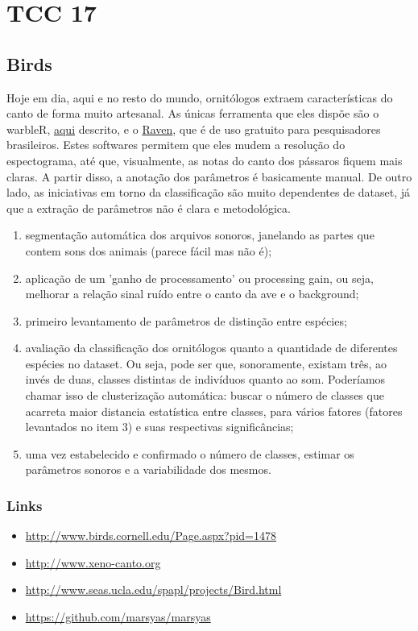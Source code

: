 \documentclass[11pt]{article}
\author{Felipe Felix}
\date{\today}
\title{}
\begin{document}
\tableofcontents


\section{TCC 17}
\label{sec:org5c751d4}
\subsection{Birds}
\label{sec:org2c85691}
Hoje em dia, aqui e no resto do mundo, ornitólogos extraem características do
canto de forma muito artesanal. As únicas ferramenta que eles dispõe são o
warbleR, \href{http://onlinelibrary.wiley.com/doi/10.1111/2041-210X.12624/full}{aqui} descrito, e o \href{http://www.birds.cornell.edu/brp/raven/RavenOverview.html}{Raven}, que é de uso gratuito para pesquisadores
brasileiros. Estes softwares permitem que eles mudem a resolução do
espectograma, até que, visualmente, as notas do canto dos pássaros fiquem
mais claras. A partir disso, a anotação dos parâmetros é basicamente manual.
De outro lado, as iniciativas em torno da classificação são muito dependentes
de dataset, já que a extração de parâmetros não é clara e metodológica.

\begin{enumerate}
\item segmentação automática dos arquivos sonoros, janelando as partes que contem sons dos animais (parece fácil mas não é);
\item aplicação de um 'ganho de processamento' ou processing gain, ou seja, melhorar a relação sinal ruído entre o canto da ave e o background;
\item primeiro levantamento de parâmetros de distinção entre espécies;
\item avaliação da classificação dos ornitólogos quanto a quantidade de diferentes espécies no dataset. Ou seja, pode ser que, sonoramente, existam três, ao invés de duas, classes distintas de indivíduos quanto ao som. Poderíamos chamar isso de clusterização automática: buscar o número de classes que acarreta maior distancia estatística entre classes, para vários fatores (fatores levantados no item 3) e suas respectivas significâncias;
\item uma vez estabelecido e confirmado o número de classes, estimar os parâmetros sonoros e a variabilidade dos mesmos.
\end{enumerate}

\subsubsection{Links}
\label{sec:org14b0b65}
\begin{itemize}
\item \url{http://www.birds.cornell.edu/Page.aspx?pid=1478}
\item \url{http://www.xeno-canto.org}
\item \url{http://www.seas.ucla.edu/spapl/projects/Bird.html}
\item \url{https://github.com/marsyas/marsyas}
\end{itemize}
\end{document}
